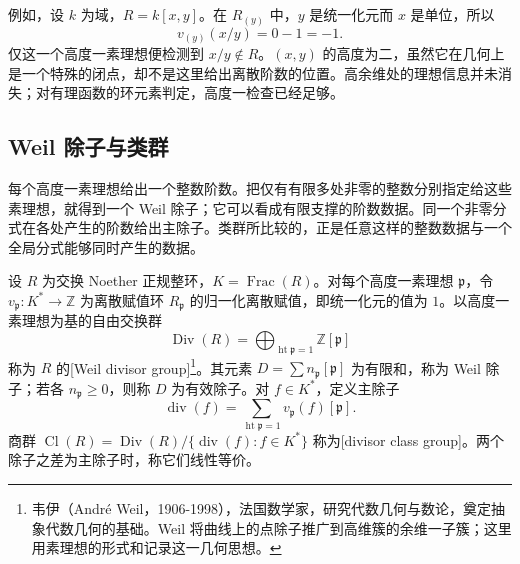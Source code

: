 \ProseParagraphBreak
例如，设 \(k\) 为域，\(R=k[x,y]\)。在 \(R_{(y)}\) 中，\(y\) 是统一化元而 \(x\) 是单位，所以
\[
	v_{(y)}(x/y)=0-1=-1.
\]
仅这一个高度一素理想便检测到 \(x/y\notin R\)。\((x,y)\) 的高度为二，虽然它在几何上是一个特殊的闭点，却不是这里给出离散阶数的位置。高余维处的理想信息并未消失；对有理函数的环元素判定，高度一检查已经足够。

\subsection{Weil 除子与类群}
\label{b3:subsec:2003:02}

每个高度一素理想给出一个整数阶数。把仅有有限多处非零的整数分别指定给这些素理想，就得到一个 Weil 除子；它可以看成有限支撑的阶数数据。同一个非零分式在各处产生的阶数给出主除子。类群所比较的，正是任意这样的整数数据与一个全局分式能够同时产生的数据。

\begin{definition}\label{b3:def:weil-divisor-class-group}
	设 \(R\) 为交换 Noether 正规整环，\(K=\operatorname{Frac}(R)\)。对每个高度一素理想 \(\mathfrak p\)，令 \(v_{\mathfrak p}:K^*\to\mathbb Z\) 为离散赋值环 \(R_{\mathfrak p}\) 的归一化离散赋值，即统一化元的值为 \(1\)。以高度一素理想为基的自由交换群
	\[
		\operatorname{Div}(R)=\bigoplus_{\operatorname{ht}\mathfrak p=1}\mathbb Z[\mathfrak p]
	\]
	称为 \(R\) 的[Weil divisor group]\footnote{韦伊（André Weil，1906-1998），法国数学家，研究代数几何与数论，奠定抽象代数几何的基础。Weil 将曲线上的点除子推广到高维簇的余维一子簇；这里用素理想的形式和记录这一几何思想。}。其元素 \(D=\sum n_{\mathfrak p}[\mathfrak p]\) 为有限和，称为 Weil 除子；若各 \(n_{\mathfrak p}\ge0\)，则称 \(D\) 为有效除子。对 \(f\in K^*\)，定义主除子
	\[
		\operatorname{div}(f)=\sum_{\operatorname{ht}\mathfrak p=1}v_{\mathfrak p}(f)[\mathfrak p].
	\]
	商群 \(\operatorname{Cl}(R)=\operatorname{Div}(R)/\{\operatorname{div}(f):f\in K^*\}\) 称为[divisor class group]。两个除子之差为主除子时，称它们线性等价。
\end{definition}

